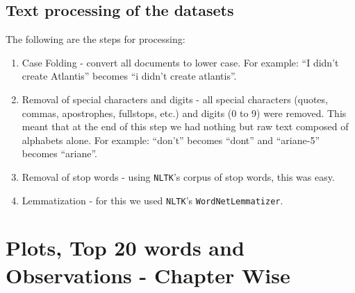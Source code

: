\documentclass{article}
\begin{document}
\subsection{Text processing of the datasets}
\begin{flushleft}
	The following are the steps for processing:
	\begin{enumerate}
		\item Case Folding - convert all documents to lower case. For example: ``I didn't create Atlantis'' becomes ``i didn't create atlantis''.
		\item Removal of special characters and digits - all special characters (quotes, commas, apostrophes, fullstops, etc.) and digits (0 to 9) were removed. This meant that at the end of this step we had nothing but raw text composed of alphabets alone. For example: ``don't'' becomes ``dont'' and ``ariane-5'' becomes ``ariane''.
		\item Removal of stop words - using \texttt{NLTK}'s corpus of stop words, this was easy.
		\item Lemmatization - for this we used \texttt{NLTK}'s \texttt{WordNetLemmatizer}.
	\end{enumerate}
\end{flushleft}

\section{Plots, Top 20 words and Observations - Chapter Wise}
\end{document}
